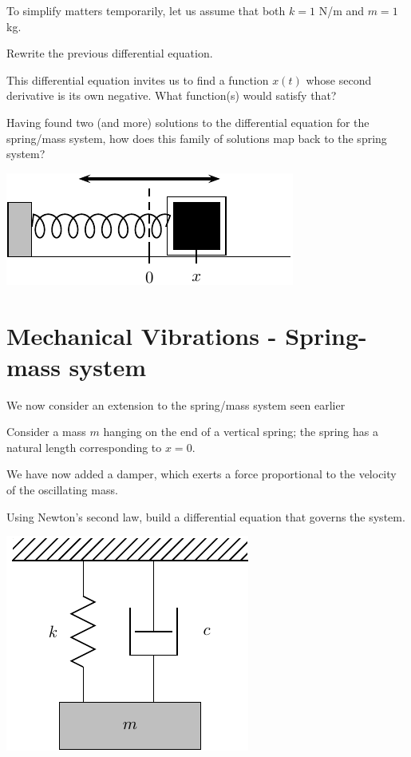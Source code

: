 To simplify matters temporarily, let us assume that both
  $k = 1 $ N/m and $m = 1$ kg. 

  \problem Rewrite the previous differential equation.  \vfill

  This differential equation invites us to find a function $x(t)$
  whose second derivative is its own negative.  What function(s) would
  satisfy that?  \vfill

\newpage

\problem Having found two (and more) solutions to the differential
equation for the spring/mass system, how does this family of solutions
map back to the spring system?

\begin{center}
\includegraphics[width=0.5\linewidth]{graphics/notes_08_block}
\end{center}

\newpage


\section*{Mechanical Vibrations - Spring-mass system}

We now consider an extension to the spring/mass system seen earlier

Consider a mass $m$ hanging on the end of a vertical spring; the
spring has a natural length corresponding to $x=0$.  

We have now added a damper, which exerts a force proportional to the
velocity of the oscillating mass.

\problem Using Newton's second law, build a differential equation that
governs the system.

\includegraphics[width=0.4\linewidth]{graphics/notes_08_hanging_mass}


